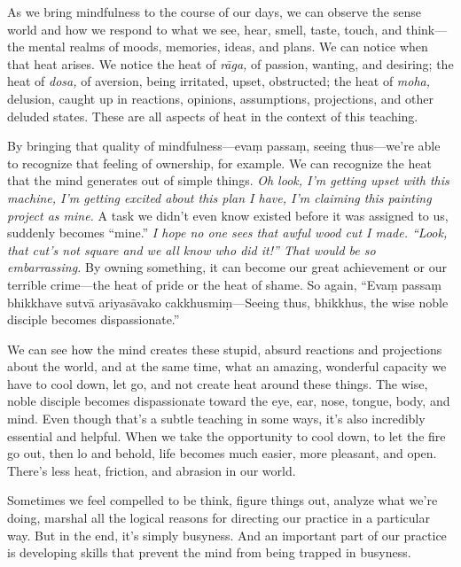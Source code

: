 As we bring mindfulness to the course of our days, we can observe the 
sense world and how we respond to what we see, hear, smell, taste, 
touch, and think---the mental realms of moods, memories, ideas, and 
plans. We can notice when that heat arises. We notice the heat of 
\emph{rāga,} of passion, wanting, and desiring; the heat of 
\emph{dosa,} of aversion, being irritated, upset, obstructed; the heat 
of \emph{moha,} delusion, caught up in reactions, opinions, 
assumptions, projections, and other deluded states. These are all 
aspects of heat in the context of this teaching.

By bringing that quality of mindfulness---evaṃ passaṃ, seeing 
thus---we're able to recognize that feeling of ownership, for example. 
We can recognize the heat that the mind generates out of simple things. 
\emph{Oh look, I'm getting upset with this machine, I'm getting excited 
about this plan I have, I'm claiming this painting project as mine.} A 
task we didn't even know existed before it was assigned to us, suddenly 
becomes ``mine.'' \emph{I hope no one sees that awful wood cut I made. 
``Look, that cut's not square and we all know who did it!'' That would 
be so embarrassing.} By owning something, it can become our great 
achievement or our terrible crime---the heat of pride or the heat of 
shame. So again, ``Evaṃ passaṃ bhikkhave sutvā ariyasāvako 
cakkhusmiṃ---Seeing thus, bhikkhus, the wise noble disciple becomes 
dispassionate.''

We can see how the mind creates these stupid, absurd reactions and 
projections about the world, and at the same time, what an amazing, 
wonderful capacity we have to cool down, let go, and not create heat 
around these things. The wise, noble disciple becomes dispassionate 
toward the eye, ear, nose, tongue, body, and mind. Even though that's a 
subtle teaching in some ways, it's also incredibly essential and 
helpful. When we take the opportunity to cool down, to let the fire go 
out, then lo and behold, life becomes much easier, more pleasant, and 
open. There's less heat, friction, and abrasion in our world.


Sometimes we feel compelled to be think, figure things out, analyze 
what we're doing, marshal all the logical reasons for directing our 
practice in a particular way. But in the end, it's simply busyness. And 
an important part of our practice is developing skills that prevent the 
mind from being trapped in busyness.

